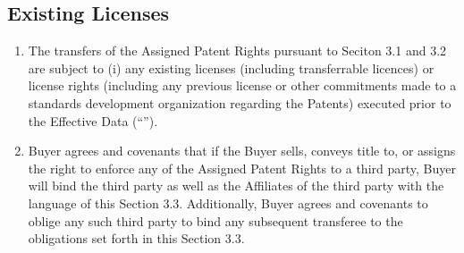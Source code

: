 \documentclass[letterpaper,10pt,english]{sphinxmanual}
\begin{document}
\subsection{Existing Licenses}
\label{\detokenize{3-transfer:existing-licenses}}\begin{enumerate}
\def\theenumi{\alph{enumi}}
\def\labelenumi{(\theenumi )}
\makeatletter\def\p@enumii{\p@enumi (\theenumi )}\makeatother
\item {} 
The transfers of the Assigned Patent Rights pursuant to Seciton 3.1 and 3.2 are subject to (i) any existing licenses (including transferrable licences) or license rights (including any previous license or other commitments made to a standards development organization regarding the Patents) executed prior to the Effective Data (“”).

\item {} 
Buyer agrees and covenants that if the Buyer sells, conveys title to, or assigns the right to enforce any of the Assigned Patent Rights to a third party, Buyer will bind the third party as well as the Affiliates of the third party with the language of this Section 3.3. Additionally, Buyer agrees and covenants to oblige any such third party to bind any subsequent transferee to the obligations set forth in this Section 3.3.

\end{enumerate}
\end{document}
